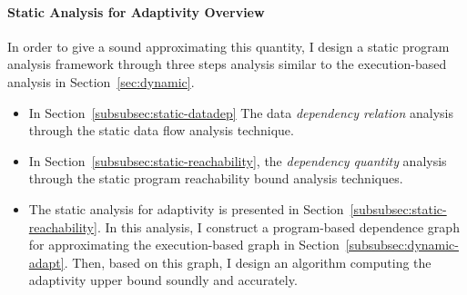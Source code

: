 \paragraph{{Static Analysis for Adaptivity} Overview}
In order to give a sound approximating this quantity, I design a static program analysis framework through three steps analysis
similar to the execution-based analysis in Section~\ref{sec:dynamic}.
\begin{itemize}
\item In Section~\ref{subsubsec:static-datadep}
The data \emph{dependency relation} analysis through the static data flow analysis technique.
\item In Section~\ref{subsubsec:static-reachability}, the \emph{dependency quantity} analysis through the static program reachability bound analysis techniques.
\item The static analysis for adaptivity is presented in Section~\ref{subsubsec:static-reachability}.
In this analysis, I construct a program-based dependence graph for approximating the execution-based graph in Section~\ref{subsubsec:dynamic-adapt}.
Then, based on this graph, I design an algorithm
computing the adaptivity upper bound soundly 
and accurately.
\end{itemize}